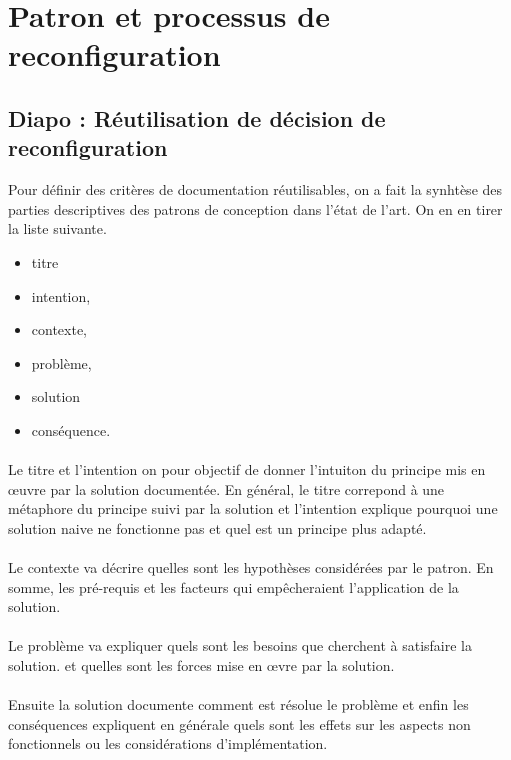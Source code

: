 \section{Patron et processus de reconfiguration}

\subsection{Diapo : Réutilisation de décision de reconfiguration}

Pour définir des critères de documentation réutilisables, on a fait la
synhtèse des parties descriptives des patrons de conception dans
l'état de l'art. On en en tirer la liste suivante. 
\begin{itemize}
\item titre
\item intention,
\item contexte, 
\item problème, 
\item solution 
\item conséquence.
\end{itemize} 

\paragraph{} 
Le titre et l'intention on pour objectif de donner l'intuiton du
principe mis en \oe{}uvre par la solution documentée. En général, le titre
correpond à une métaphore du principe suivi par la solution et
l'intention explique pourquoi une solution naive ne
fonctionne pas et quel est un principe plus adapté.   

\paragraph{} 
Le contexte va décrire quelles sont les hypothèses considérées par le
patron.  En somme, les pré-requis et les facteurs qui empêcheraient
l'application de la solution. 

\paragraph{} 
Le problème va expliquer quels sont les besoins que cherchent à
satisfaire la solution. et quelles sont les forces mise en \oe{}vre
par la solution. 

\paragraph{} 
Ensuite la solution documente comment est résolue le problème et enfin
les conséquences expliquent en générale quels sont les effets sur les
aspects non fonctionnels ou les considérations d'implémentation. 


